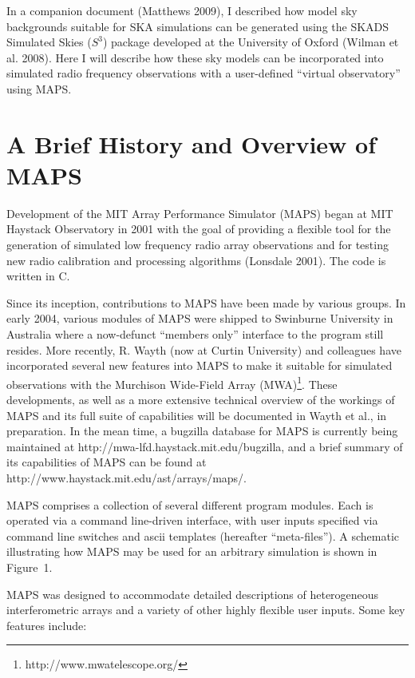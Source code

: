 \documentclass[12pt,psfig]{article}
\begin{document}
In a companion document (Matthews 2009), I
described how model sky backgrounds suitable for SKA simulations
can be generated using the
SKADS Simulated Skies ($S^{3}$) package developed at the University of
Oxford (Wilman
et al. 2008). Here I will describe how these sky models can be
incorporated into simulated radio frequency observations with a
user-defined ``virtual observatory'' using MAPS. 


\section{A Brief History and Overview of MAPS}
%
Development of the
MIT Array Performance Simulator (MAPS) began at
MIT Haystack Observatory in 2001 with the goal of providing a flexible
tool for the generation of simulated low frequency radio array observations
and for
testing new radio calibration and processing algorithms (Lonsdale
2001). The code is
written  in C. 

Since its inception, 
contributions to MAPS have been made by various groups.
In early 2004,
various modules of MAPS were shipped to Swinburne University in
Australia where a now-defunct ``members only'' interface to the program
still resides. More recently,
R. Wayth (now at Curtin University) and colleagues have
incorporated several new features into MAPS to make it suitable
for simulated observations with the Murchison
Wide-Field Array (MWA)\footnote{http://www.mwatelescope.org/}. 
These developments, as well as a more
extensive technical overview of the workings of MAPS and its full
suite of capabilities will be documented in Wayth et
al., in preparation. In the mean time, a bugzilla database
for  MAPS is currently being maintained 
at http://mwa-lfd.haystack.mit.edu/bugzilla, and
a brief summary of its
capabilities of MAPS can be found at
http://www.haystack.mit.edu/ast/arrays/maps/. 

MAPS comprises a collection of several different program modules.
Each is operated via a command line-driven interface, with user inputs
specified via command line switches and ascii templates 
(hereafter ``meta-files'').
A schematic illustrating how MAPS may be used for an
arbitrary simulation is shown in Figure~1.

MAPS was designed to accommodate detailed descriptions
of heterogeneous interferometric arrays and a variety of other highly
flexible user inputs. Some key features include:
\end{document}
